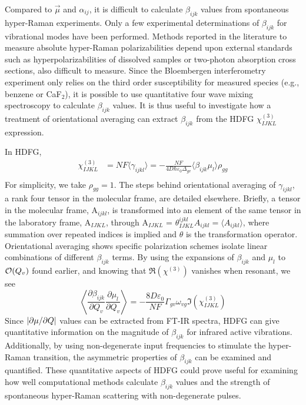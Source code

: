 \documentclass[aip, jcp, reprint, onecolumn]{revtex4-2}
\begin{document}
Compared to $\vec{\mu}$ and $\alpha_{ij}$, it is difficult to calculate $\beta_{ijk}$ values from spontaneous hyper-Raman experiments. \cite{Kelley2010}
Only a few experimental determinations of $\beta_{ijk}$ for vibrational modes have been performed. \cite{Xu1997, Shoute2005, Kelley2010}
Methods reported in the literature to measure absolute hyper-Raman polarizabilities depend upon external standards such as hyperpolarizabilities of dissolved samples or two-photon absorption cross sections, also difficult to measure. \cite{Okuno2020}
Since the Bloembergen interferometry experiment only relies on the third order susceptibility for measured species (e.g., benzene or CaF$_2$),\cite{Levenson1974_2} it is possible to use quantitative four wave mixing spectroscopy to calculate $\beta_{ijk}$ values.
It is thus useful to investigate how a treatment of orientational averaging can extract $\beta_{ijk}$ from the HDFG $\chi^{(3)}_{IJKL}$ expression.

In HDFG, 
\begin{equation}\label{chi3}
\begin{split}
		\chi^{(3)}_{IJKL} &= NF \langle \gamma_{ijkl} \rangle = -\frac{NF}{4D \hbar \varepsilon_0 \Delta_{gv}} \langle \beta_{ijk} \mu_l \rangle \rho_{gg}\\
\end{split}
\end{equation}
For simplicity, we take $\rho_{gg} = 1$.
The steps behind orientational averaging of $\gamma_{ijkl}$, a rank four tensor in the molecular frame, are detailed elsewhere.\cite{Andrews1977, McDonnell2024}
Briefly, a tensor in the molecular frame, A$_{ijkl}$, is transformed into an element of the same tensor in the laboratory frame, A$_{IJKL}$, through A$_{IJKL}$ = $\theta^{ijkl}_{IJKL} A_{ijkl} = \langle A_{ijkl} \rangle$, where summation over repeated indices is implied and $\theta$ is the transformation operator. \cite{McDonnell2024}
Orientational averaging shows specific polarization schemes isolate linear combinations of different $\beta_{ijk}$ terms. \cite{Bersohn1966, Willetts1992, Kauranen1996}
By using the expansions of $\beta_{ijk}$ and $\mu_{l}$ to $\order{Q_v}$ found earlier, and knowing that $\Re(\chi^{(3)})$ vanishes when resonant, we see
\begin{equation}\label{betasive}
	\left\langle \frac{\partial \beta_{ijk}}{\partial Q_v} {\frac{\partial \mu_l}{\partial Q_v}} \right\rangle = -\frac{8D \varepsilon_0}{NF}  {\Gamma_{gv} \omega_{vg}} {\Im(\chi^{(3)}_{IJKL})}
\end{equation}
Since $\abs{\partial \mu / \partial Q}$ values can be extracted from FT-IR spectra,\cite{RN459} HDFG can give quantitative information on the magnitude of $\beta_{ijk}$ for infrared active vibrations.
Additionally, by using non-degenerate input frequencies to stimulate the hyper-Raman transition, the asymmetric properties of $\beta_{ijk}$ can be examined and quantified. \cite{Christie1971, Denisov1986, Kozich2007}
These quantitative aspects of HDFG could prove useful for examining how well computational methods calculate $\beta_{ijk}$ values and the strength of spontaneous hyper-Raman scattering with non-degenerate pulses.
\end{document}
